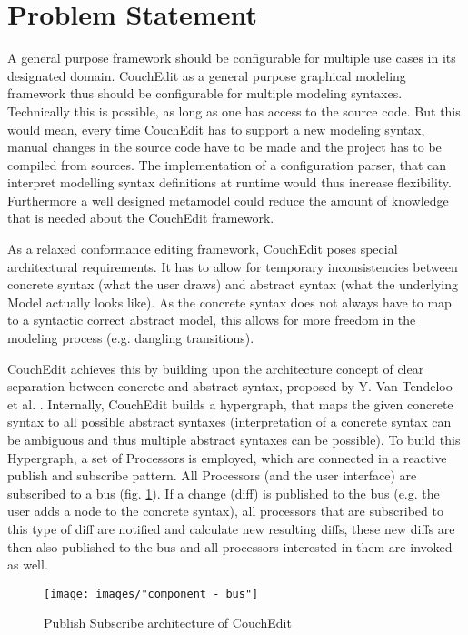 \section{Problem Statement}
\label{sec:problem_statement}

A general purpose framework should be configurable for multiple use cases in its designated domain. CouchEdit as a general purpose graphical modeling framework thus should be configurable for multiple modeling syntaxes. Technically this is possible, as long as one has access to the source code. But this would mean, every time CouchEdit has to support a new modeling syntax, manual changes in the source code have to be made and the project has to be compiled from sources. The implementation of a configuration parser, that can interpret modelling syntax definitions at runtime would thus increase flexibility. Furthermore a well designed metamodel could reduce the amount of knowledge that is needed about the CouchEdit framework.

As a relaxed conformance editing framework, CouchEdit poses special architectural requirements. It has to allow for temporary inconsistencies between concrete syntax (what the user draws) and abstract syntax (what the underlying Model actually looks like). As the concrete syntax does not always have to map to a syntactic correct abstract model, this allows for more freedom in the modeling process (e.g. dangling transitions).

CouchEdit achieves this by building upon the architecture concept of clear separation between concrete and abstract syntax, proposed by Y. Van Tendeloo et al. \cite{van_tendeloo_concrete_2017}. Internally, CouchEdit builds a hypergraph, that maps the given concrete syntax to all possible abstract syntaxes (interpretation of a concrete syntax can be ambiguous and thus multiple abstract syntaxes can be possible). To build this Hypergraph, a set of Processors is employed, which are connected in a reactive publish and subscribe pattern. All Processors (and the user interface) are subscribed to a bus (fig. \ref{fig:processors}). If a change (diff) is published to the bus (e.g. the user adds a node to the concrete syntax), all processors that are subscribed to this type of diff are notified and calculate new resulting diffs, these new diffs are then also published to the bus and all processors interested in them are invoked as well.

\begin{figure}
  \centering
  \texttt{[image: images/"component - bus"]}
  \caption{Publish Subscribe architecture of CouchEdit}
  \label{fig:processors}
\end{figure}

